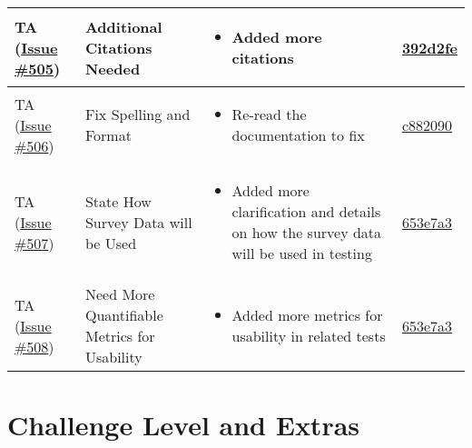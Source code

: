 \documentclass{article}
\begin{document}
\begin{longtable}{|p{2cm}|p{3.5cm}|p{4.5cm}|p{3cm}|}
    TA (\href{https://github.com/ssm-lab/capstone--source-code-optimizer/issues/505}{Issue \#505}) & 
    Additional Citations Needed &
    \begin{itemize}[nosep,leftmargin=*]
        \item Added more citations
    \end{itemize} &
    \href{https://github.com/ssm-lab/capstone--source-code-optimizer/commit/392d2fed426d09ca5d226ed9bf5661db71c03b45}{392d2fe} \\
    \hline
    
    TA (\href{https://github.com/ssm-lab/capstone--source-code-optimizer/issues/506}{Issue \#506}) & 
    Fix Spelling and Format &
    \begin{itemize}[nosep,leftmargin=*]
        \item Re-read the documentation to fix
    \end{itemize} &
    \href{https://github.com/ssm-lab/capstone--source-code-optimizer/commit/c88209079443e8c2722190a65d204b4193b426e2}{c882090} \\
    \hline
    
    TA (\href{https://github.com/ssm-lab/capstone--source-code-optimizer/issues/507}{Issue \#507}) & 
    State How Survey Data will be Used &
    \begin{itemize}[nosep,leftmargin=*]
        \item Added more clarification and details on how the survey data will be used in testing
    \end{itemize} &
    \href{https://github.com/ssm-lab/capstone--source-code-optimizer/commit/653e7a3757dadfda6df3a3dce1aa7de512d62029}{653e7a3} \\
    \hline

    TA (\href{https://github.com/ssm-lab/capstone--source-code-optimizer/issues/508}{Issue \#508}) & 
    Need More Quantifiable Metrics for Usability &
    \begin{itemize}[nosep,leftmargin=*]
        \item Added more metrics for usability in related tests
    \end{itemize} &
    \href{https://github.com/ssm-lab/capstone--source-code-optimizer/commit/653e7a3757dadfda6df3a3dce1aa7de512d62029}{653e7a3} \\
    \hline
    
\end{longtable}


\section{Challenge Level and Extras}
\end{document}
